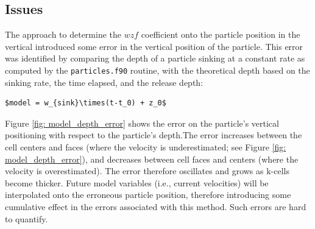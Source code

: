 \documentclass[]{article}
\begin{document}
\subsection*{Issues}
The approach to determine the $wzf$ coefficient onto the particle position in the vertical introduced some error in the vertical position of the particle. This error was identified by comparing the depth of a particle sinking at a constant rate as computed by the \texttt{particles.f90} routine, with the theoretical depth based on the sinking rate, the time elapsed, and the release depth:

\begin{lstlisting}[mathescape=true]
$model = w_{sink}\times(t-t_0) + z_0$
\end{lstlisting}

Figure \ref{fig: model_depth_error} shows the error on the particle's vertical positioning
with respect to the particle's depth.The error increases between the cell centers and faces (where the velocity is underestimated; see Figure \ref{fig: model_depth_error}), and decreases between cell faces and centers (where the velocity is overestimated). The error therefore oscillates and grows as k-cells become thicker. Future model variables (i.e., current velocities) will be interpolated onto the erroneous particle position, therefore introducing some cumulative effect in the errors associated with this method. Such errors are hard to quantify.
\end{document}
